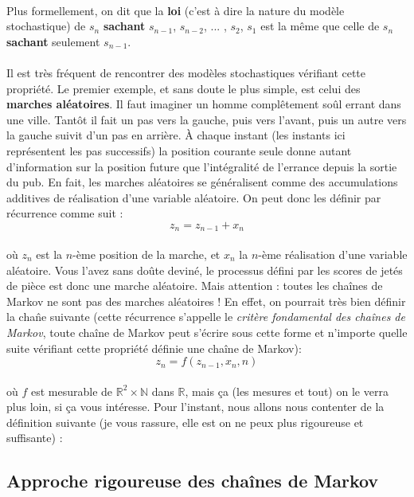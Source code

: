 \documentclass[english]{article}
\begin{document}
\\
Plus formellement, on dit que la \textbf{loi} (c'est à dire la nature du modèle stochastique) de $s_n$ \textbf{sachant}  $s_{n-1}$, $s_{n-2}$, ... , $s_2$, $s_1$ est la m\^eme que celle de $s_n$ \textbf{sachant} seulement $s_{n-1}$.\\
\\
Il est très fréquent de rencontrer des modèles stochastiques vérifiant cette propriété. Le premier exemple, et sans doute le plus simple, est celui des \textbf{marches aléatoires}. Il faut imaginer un homme compl\^etement so\^ul errant dans une ville. Tantôt il fait un pas vers la gauche, puis vers l'avant, puis un autre vers la gauche suivit d'un pas en arrière. À chaque instant (les instants ici représentent les pas successifs) la position courante seule donne autant d'information sur la position future que l'intégralité de l'errance depuis la sortie du pub. En fait, les marches aléatoires se généralisent comme des accumulations additives de réalisation d'une variable aléatoire. On peut donc les définir par récurrence  comme suit :
\[z_n = z_{n-1} + x_n\]   
\\
où $z_n$ est la $n$-ème position de la marche, et $x_n$ la $n$-ème réalisation d'une variable aléatoire. Vous l'avez sans do\^ute deviné, le processus défini par les scores de jetés de pièce est donc une marche aléatoire. Mais attention : toutes les cha\^ines de Markov ne sont pas des marches aléatoires ! En effet, on pourrait très bien définir la cha\^ne suivante (cette récurrence s'appelle le \textit{critère fondamental des cha\^ines de Markov}, toute cha\^ine de Markov peut s'écrire sous cette forme et n'importe quelle suite vérifiant cette propriété définie une cha\^ine de Markov): 
\[z_n = \mathit{f}(z_{n-1},x_n,n)\]
\\
où $\mathit{f}$ est mesurable de $\mathbb{R}^2\times\mathbb{N}$ dans $\mathbb{R}$, mais ça (les mesures et tout) on le verra plus loin, si ça vous intéresse. Pour l'instant, nous allons nous contenter de la définition suivante (je vous rassure, elle est on ne peux plus rigoureuse et suffisante) :

\newpage
\subsection{Approche rigoureuse des cha\^ ines de Markov}
\end{document}
